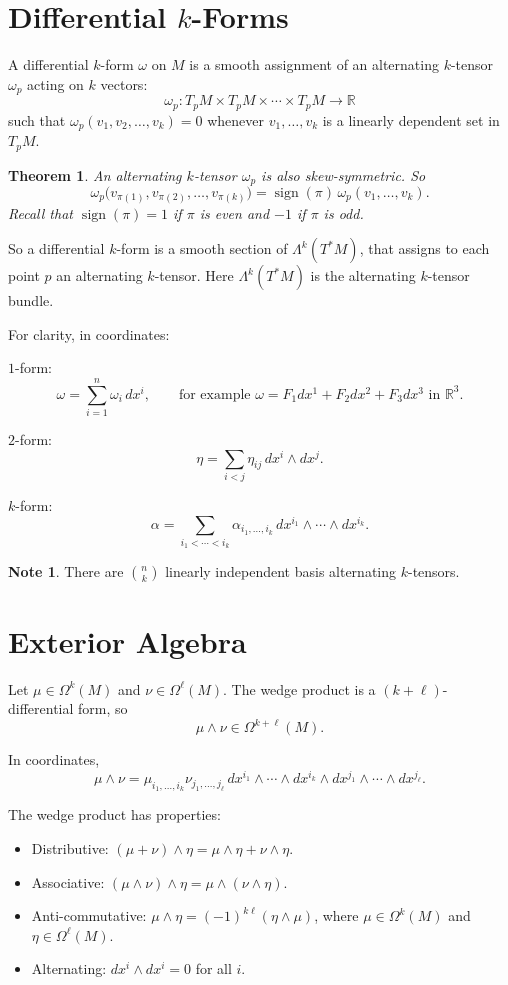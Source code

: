 \documentclass[11pt]{report}
\theoremstyle{definition}
\newtheorem{note}[definition]{Note}
\theoremstyle{plain}
\newtheorem{theorem}[definition]{Theorem}
\theoremstyle{remark}
\newcommand{\R}{\mathbb{R}}
\begin{document}
\section{Differential \texorpdfstring{$k$}{k}-Forms}

A differential $k$-form $\omega$ on $M$ is a smooth assignment of an alternating $k$-tensor $\omega_p$ acting on $k$ vectors:
\[
\omega_p:T_pM\times T_pM\times \cdots \times T_pM\to \R
\]
such that $\omega_p(v_1,v_2,\dots,v_k)=0$ whenever $v_1,\dots,v_k$ is a linearly dependent set in $T_pM$.

\begin{theorem}
An alternating $k$-tensor $\omega_p$ is also skew-symmetric. So
\[
\omega_p\bigl(v_{\pi(1)},v_{\pi(2)},\dots,v_{\pi(k)}\bigr)=\operatorname{sign}(\pi)\,\omega_p(v_1,\dots,v_k).
\]
Recall that $\operatorname{sign}(\pi)=1$ if $\pi$ is even and $-1$ if $\pi$ is odd.
\end{theorem}

So a differential $k$-form is a smooth section of $\Lambda^k(T^*M)$, that assigns to each point $p$ an alternating $k$-tensor. Here $\Lambda^k(T^*M)$ is the alternating $k$-tensor bundle.

For clarity, in coordinates:

$1$-form:
\[
\omega = \sum_{i=1}^n \omega_i\,dx^i,
\qquad \text{for example } \omega=F_1dx^1+F_2dx^2+F_3dx^3 \text{ in } \R^3.
\]

$2$-form:
\[
\eta = \sum_{i<j} \eta_{ij}\,dx^i\wedge dx^j.
\]

$k$-form:
\[
\alpha = \sum_{i_1<\cdots<i_k} \alpha_{i_1,\dots,i_k}\,dx^{i_1}\wedge\cdots\wedge dx^{i_k}.
\]

\begin{note}
There are $\binom{n}{k}$ linearly independent basis alternating $k$-tensors.
\end{note}

\section{Exterior Algebra}

Let $\mu\in\Omega^k(M)$ and $\nu\in\Omega^\ell(M)$. The wedge product is a $(k+\ell)$-differential form, so
\[
\mu\wedge\nu\in\Omega^{k+\ell}(M).
\]

In coordinates,
\[
\mu\wedge\nu
=
\mu_{i_1,\dots,i_k}\nu_{j_1,\dots,j_\ell}
\,dx^{i_1}\wedge\cdots\wedge dx^{i_k}\wedge dx^{j_1}\wedge\cdots\wedge dx^{j_\ell}.
\]

The wedge product has properties:
\begin{itemize}
    \item Distributive: $(\mu+\nu)\wedge\eta = \mu\wedge\eta + \nu\wedge\eta$.
    \item Associative: $(\mu\wedge\nu)\wedge\eta = \mu\wedge(\nu\wedge\eta)$.
    \item Anti-commutative: $\mu\wedge\eta = (-1)^{k\ell}(\eta\wedge\mu)$, where $\mu\in\Omega^k(M)$ and $\eta\in\Omega^\ell(M)$.
    \item Alternating: $dx^i\wedge dx^i=0$ for all $i$.
\end{itemize}
\end{document}
